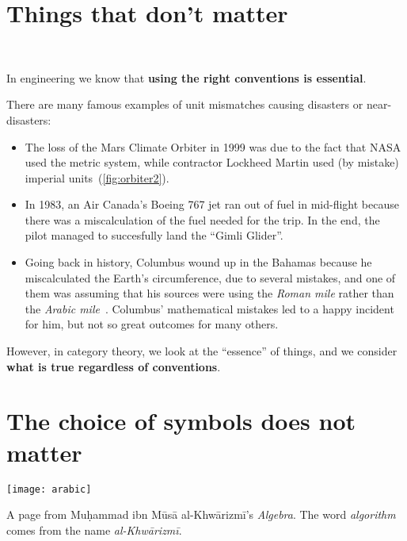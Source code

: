 
\section{Things that don't matter}

\begin{marginfigure}
     \\
    \caption{}
    \label{fig:orbiter}
\end{marginfigure}

In engineering we know that \textbf{using the right conventions is essential}.

There are many famous examples of unit mismatches causing disasters or near-disasters:
\begin{itemize}
    \item The loss of the Mars Climate Orbiter in 1999 was due to the fact that NASA used the metric system,
          while contractor Lockheed Martin used (by mistake) imperial units~(\cref{fig:orbiter2}).
    \item In 1983, an Air Canada’s Boeing 767 jet ran out of fuel in mid-flight because there was a miscalculation of the fuel needed for the trip.
          In the end, the pilot managed to succesfully land the ``Gimli Glider''.
    \item Going back in history, Columbus wound up in the Bahamas because he miscalculated the Earth's circumference, due to several mistakes, and one of them was assuming that his sources were using the \emph{Roman mile} rather than the \emph{Arabic mile}~\cite{morison2007admiral}.
          Columbus' mathematical mistakes led to a happy incident for him, but not so great outcomes for many others.
\end{itemize}

However, in category theory, we look at the ``essence'' of things, and we consider \textbf{what is true regardless of conventions}.

\section{The choice of symbols does not matter}

\begin{marginfigure}\centering
    \texttt{[image: arabic]}
    \caption{A page from Mu\d{h}ammad ibn Mūsā al-Khwārizmī's \emph{Algebra}.
        The word \emph{algorithm} comes from the name \emph{al-Khwārizmī}.
    }
\end{marginfigure}


